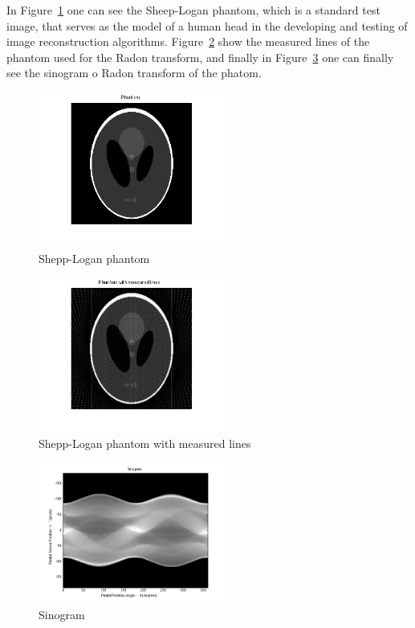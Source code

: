 \documentclass[a4paper]{article}
\begin{document}
In Figure~\ref{fig:Sheep-Logan-Phantom} one can see the Sheep-Logan phantom, which is a standard test image, that serves as the model of a human head in the developing and testing of image reconstruction algorithms. Figure~\ref{fig:Sheep-Logan-Phantom-Measured} show the measured lines of the phantom used for the Radon transform, and finally in Figure~\ref{fig:Sinogram} one can finally see the sinogram o Radon transform of the phatom.

\begin{figure}[h!]
\centering
\includegraphics[width = 0.55\textwidth]{./phantom.png}
\caption{Shepp-Logan phantom}
\label{fig:Sheep-Logan-Phantom}
\end{figure}

\begin{figure}[h!]
\centering
\includegraphics[width = 0.55\textwidth]{./phantom_measured.png}
\caption{Shepp-Logan phantom with measured lines}
\label{fig:Sheep-Logan-Phantom-Measured}
\end{figure}

\begin{figure}[h!]
\centering
\includegraphics[width = 0.55\textwidth]{./sinogram.png}
\caption{Sinogram}
\label{fig:Sinogram}
\end{figure}
\end{document}
